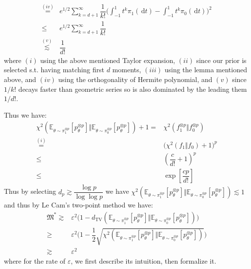 \documentclass[11pt,a4paper]{article}
\numberwithin{equation}{section}%
\begin{document}
\begin{itemize}[topsep=2pt,itemsep=0pt]
\begin{align*}
        \mathop{ = }\limits^{(iv)}&e^{1/2}\sum_{k=d+1}^\infty \dfrac{ 1 }{ k! } \big(\int_{-1}^1t^k \pi_1(\,\mathrm{d}t) - \int_{-1}^1t^k \pi_0(\,\mathrm{d}t) \big)^2 \\
        \leq&e^{1/2}\sum_{k=d+1}^\infty \dfrac{ 1 }{ k! } \\
        \mathop{ \lesssim }\limits^{(v)}& \dfrac{ 1 }{ d! }
    \end{align*}
    where $ (i) $ using the above mentioned Taylor expansion, $ (ii) $ since our prior is selected s.t. having matching first $ d $ moments, $ (iii) $ using the lemma mentioned above, and $ (iv) $ using the orthogonality of Hermite polynomial, and $ (v) $ since $ 1/k! $ decays faster than geometric series so is also dominated by the leading them $ 1/d! $.
\end{itemize}
Thus we have:
\begin{align*}
    \chi^2\left(\mathbb{E}_{ \theta \sim \pi_1^{\otimes p} }\left[ p_\theta ^{\otimes p} \right] \big\Vert \mathbb{E}_{ \theta \sim \pi_0^{\otimes p} }\left[ p_\theta ^{\otimes p} \right] \right) +1 =& \chi^2\left( f_1 ^{\otimes p} \big\Vert f_0 ^{\otimes p} \right)\\
    \mathop{ = }\limits^{(i)}& \Big( \chi^2(f_1\big\Vert f_0)  +1 \Big) ^p\\
    \leq& (\dfrac{ c }{ d! } +1 )^p\\
    \leq& \exp\left[ \dfrac{ cp }{ d! }  \right]
\end{align*}
Thus by selecting $ d_p\gtrsim  \dfrac{ \log p }{ \log\log p } $ we have $ \chi^2\left(\mathbb{E}_{ \theta \sim \pi_1^{\otimes p} }\left[ p_\theta ^{\otimes p} \right] \big\Vert \mathbb{E}_{ \theta \sim \pi_0^{\otimes p} }\left[ p_\theta ^{\otimes p} \right] \right)  \lesssim 1 $ and thus by Le Cam's two-point method we have:
\begin{align*}
    \mathfrak{M}^* \gtrsim & \varepsilon ^2\big(1 - d_\mathrm{ TV }\left(\mathbb{E}_{ \theta \sim \pi_1^{\otimes p} }\left[ p_\theta ^{\otimes p} \right] \big\Vert \mathbb{E}_{ \theta \sim \pi_0^{\otimes p} }\left[ p_\theta ^{\otimes p} \right] \right)\big) \\
    \geq& \varepsilon ^2\big(1 - \dfrac{ 1 }{ 2 }\sqrt{\chi^2 \left(\mathbb{E}_{ \theta \sim \pi_1^{\otimes p} }\left[ p_\theta ^{\otimes p} \right] \big\Vert \mathbb{E}_{ \theta \sim \pi_0^{\otimes p} }\left[ p_\theta ^{\otimes p} \right] \right) } \big)\\
    \gtrsim& \varepsilon ^2
\end{align*}
where for the rate of $ \varepsilon  $, we first describe its intuition, then formalize it. 
\end{document}

